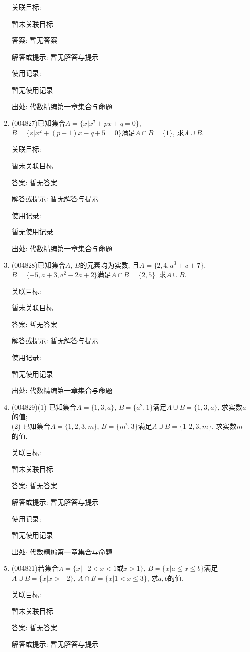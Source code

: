 \documentclass[10pt,a4paper]{article}
\begin{document}
\begin{enumerate}[1.]
关联目标:

暂未关联目标

答案: 暂无答案

解答或提示: 暂无解答与提示

使用记录:

暂无使用记录


出处: 代数精编第一章集合与命题
\item { (004827)}已知集合$A=\{x|x^2+px+q=0\}$, $B=\{x|x^2+(p-1)x-q+5=0\}$满足$A\cap B=\{1\}$, 求$A\cup B$.


关联目标:

暂未关联目标

答案: 暂无答案

解答或提示: 暂无解答与提示

使用记录:

暂无使用记录


出处: 代数精编第一章集合与命题
\item { (004828)}已知集合$A$, $B$的元素均为实数, 且$A=\{2,4,a^3+a+7\}$, $B=\{-5,a+3,a^2-2a+2\}$满足$A\cap B=\{2,5\}$, 求$A\cup B$.


关联目标:

暂未关联目标

答案: 暂无答案

解答或提示: 暂无解答与提示

使用记录:

暂无使用记录


出处: 代数精编第一章集合与命题
\item { (004829)}(1) 已知集合$A=\{1,3,a\}$, $B=\{a^2,1\}$满足$A\cup B=\{1,3,a\}$, 求实数$a$的值;\\
(2) 已知集合$A=\{1,2,3,m\}$, $B=\{m^2,3\}$满足$A\cup B=\{1,2,3,m\}$, 求实数$m$的值.


关联目标:

暂未关联目标

答案: 暂无答案

解答或提示: 暂无解答与提示

使用记录:

暂无使用记录


出处: 代数精编第一章集合与命题
\item { (004831)}若集合$A=\{x|-2<x<1\text{或}x>1\}$, $B=\{x|a\le x\le b\}$满足$A\cup B=\{x|x>-2\}$, $A\cap B=\{x|1<x\le 3\}$, 求$a,b$的值.


关联目标:

暂未关联目标

答案: 暂无答案

解答或提示: 暂无解答与提示


\end{enumerate}
\end{document}
